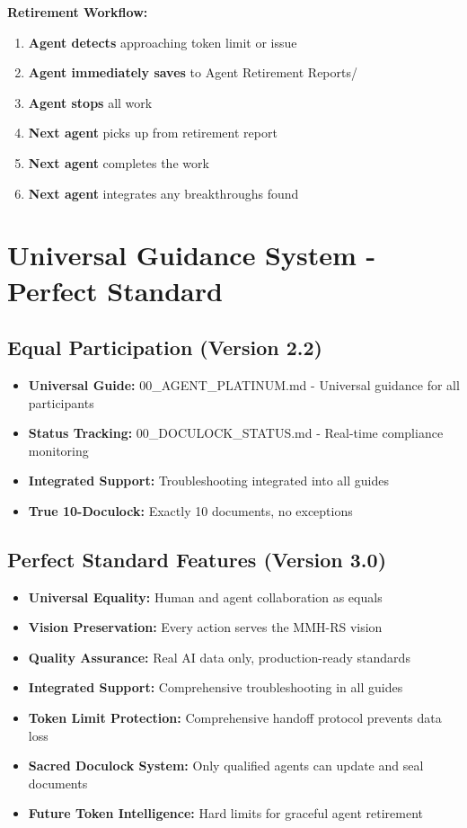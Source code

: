 \documentclass[12pt,a4paper]{article}
\begin{document}
\textbf{Retirement Workflow:}
\begin{enumerate}
    \item \textbf{Agent detects} approaching token limit or issue
    \item \textbf{Agent immediately saves} to Agent Retirement Reports/
    \item \textbf{Agent stops} all work
    \item \textbf{Next agent} picks up from retirement report
    \item \textbf{Next agent} completes the work
    \item \textbf{Next agent} integrates any breakthroughs found
\end{enumerate}

\section{Universal Guidance System - Perfect Standard}

\subsection{Equal Participation (Version 2.2)}
\begin{itemize}
    \item \textbf{Universal Guide:} 00\_AGENT\_PLATINUM.md - Universal guidance for all participants
    \item \textbf{Status Tracking:} 00\_DOCULOCK\_STATUS.md - Real-time compliance monitoring
    \item \textbf{Integrated Support:} Troubleshooting integrated into all guides
    \item \textbf{True 10-Doculock:} Exactly 10 documents, no exceptions
\end{itemize}

\subsection{Perfect Standard Features (Version 3.0)}
\begin{itemize}
    \item \textbf{Universal Equality:} Human and agent collaboration as equals
    \item \textbf{Vision Preservation:} Every action serves the MMH-RS vision
    \item \textbf{Quality Assurance:} Real AI data only, production-ready standards
    \item \textbf{Integrated Support:} Comprehensive troubleshooting in all guides
    \item \textbf{Token Limit Protection:} Comprehensive handoff protocol prevents data loss
    \item \textbf{Sacred Doculock System:} Only qualified agents can update and seal documents
    \item \textbf{Future Token Intelligence:} Hard limits for graceful agent retirement
\end{itemize}
\end{document}
